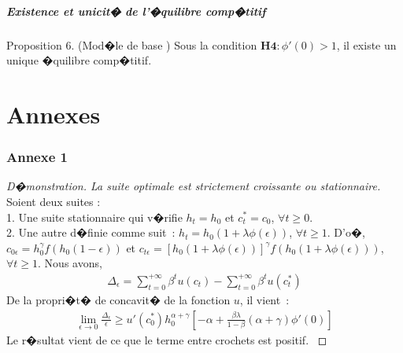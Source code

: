 \documentclass[10pt, hyperref={pdfpagemode=FullScreen}]{beamer} %
\begin{document}
\begin{frame}
\frametitle{Existence et unicit� de l'�quilibre comp�titif}
\begin{block}{Proposition 6. (Mod�le de base \hyperlink{annexe5part1}{})}\label{proposition6}
\scriptsize{
Sous la condition $\mathbf{H4 : } \phi'(0)>1$, il existe un unique �quilibre comp�titif. 
}
\end{block}
\end{frame}







\part{Annexes}

\section{Annexe 1}

\begin{frame}\label{annexe1}
\begin{proof}[\scriptsize{D�monstration. La suite optimale est strictement croissante ou stationnaire}]
Soient deux suites : \\
1. Une suite stationnaire qui v�rifie $h_{t}=h_{0}$ et $c_{t}^{*}=c_{0}$, $\forall t\geq 0$. \\
2. Une autre d�finie comme suit~: $h_{t}=h_{0}(1+\lambda\phi(\epsilon))$, $\forall t\geq 1$. D'o�, $c_{0\epsilon}=h_{0}^{\gamma}f(h_{0}(1-\epsilon))$ et $c_{t\epsilon}=[h_{0}(1+\lambda\phi(\epsilon))]^{\gamma}f(h_{0}(1+\lambda\phi(\epsilon)))$, $\forall t\geq 1$. Nous avons, 
\begin{eqnarray*}
\Delta_{\epsilon}=\sum_{t=0}^{+\infty}\beta^{t}u(c_{t})-\sum_{t=0}^{+\infty} \beta^{t}u(c_{t}^{*})
\end{eqnarray*}
De la propri�t� de concavit� de la fonction $u$, il vient~: 
\begin{eqnarray*}
\lim_{\epsilon\rightarrow 0} \frac{\Delta_{\epsilon}}{\epsilon} \geq u'(c_{0}^{*})h_{0}^{\alpha+\gamma}\left[-\alpha+\frac{\beta\lambda}{1-\beta}(\alpha+\gamma)\phi'(0)\right]
\end{eqnarray*}
Le r�sultat vient de ce que le terme entre crochets est positif. \hyperlink{proposition1}{}
\end{proof}
\end{frame}
\end{document}
